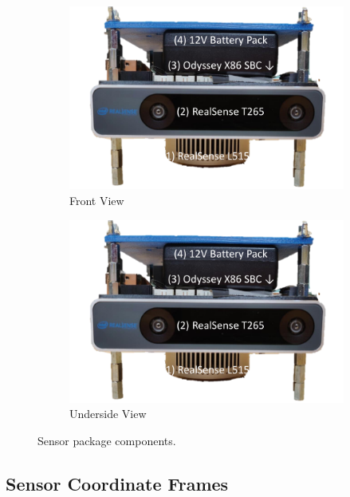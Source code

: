 \begin{figure}[!htb]
  \centering
  \begin{subfigure}[t]{.40\linewidth}
    \centering\includegraphics[page=1,clip,trim=0cm 0cm 0cm 0cm,width=.99\linewidth]{chapter_7_experiments/imgs/sensor_package.pdf}
    \caption{\label{fig:ch7_sensor_package_a}Front View}
  \end{subfigure}
  \begin{subfigure}[t]{.40\linewidth}
    \centering\includegraphics[page=3,clip,trim=0cm 0cm 0cm 0cm,width=.99\linewidth]{chapter_7_experiments/imgs/sensor_package.pdf}
    \caption{\label{fig:ch7_sensor_package_b}Underside View}
  \end{subfigure}
  \caption[Sensor package components]{Sensor package components.}\label{fig:ch7_sensor_package_pic}
\end{figure}

\subsection{Sensor Coordinate Frames}

